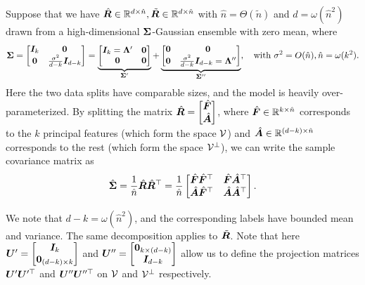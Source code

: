 Suppose that we have $\hat{{\bm{R}}} \in \mathbb{R}^{d\times \hat{n}}, \tilde{{\bm{R}}} \in \mathbb{R}^{d\times \tilde{n}}$ with $\hat{n} = \Theta(\tilde{n})$ and $d = \omega(\hat{n}^2)$ drawn from a high-dimensional ${\bm{\Sigma}}$-Gaussian ensemble with zero mean, where 
\begin{align}
    {\bm{\Sigma}}  = \begin{bmatrix}
        {\bm{I}}_k  & \mathbf{0} \\
        \mathbf{0} & \frac{\sigma^2}{d-k}{\bm{I}}_{d-k}
    \end{bmatrix} = 
    \underbrace{\begin{bmatrix}
        {\bm{I}}_k={\bm{\Lambda}}'  & \mathbf{0} \\
        \mathbf{0} & \mathbf{0}
    \end{bmatrix}}_{{\bm{\Sigma}}'} + 
    \underbrace{\begin{bmatrix}
        \mathbf{0}  & \mathbf{0} \\
        \mathbf{0} & \frac{\sigma^2}{d-k}{\bm{I}}_{d-k}={\bm{\Lambda}}''
    \end{bmatrix} }_{{\bm{\Sigma}}''}, \quad \text{with }\sigma^2 = O(\hat{n}), \hat{n} = \omega(k^2).  
\end{align}
Here the two data splits have comparable sizes, and the model is heavily over-parameterized. 
By splitting the matrix $\hat{{\bm{R}}} = \begin{bmatrix}
    \hat{{\bm{F}}} \\ \hat{{\bm{A}}}
\end{bmatrix}$, where $\hat{{\bm{F}}} \in \mathbb{R}^{k \times \hat{n}}$ corresponds to the $k$ principal features (which form the space ${\mathcal{V}}$) and $\hat{{\bm{A}}} \in \mathbb{R}^{(d-k) \times \hat{n}}$ corresponds to the rest (which form the space ${\mathcal{V}}^\perp$), we can write the sample covariance matrix as
\[
    \hat{{\bm{\Sigma}}} = \frac{1}{\hat{n}}\hat{{\bm{R}}}\hat{{\bm{R}}}^\top = \frac{1}{\hat{n}}
    \begin{bmatrix}
        \hat{{\bm{F}}}\hat{{\bm{F}}}^\top & \hat{{\bm{F}}}\hat{{\bm{A}}}^\top \\
        \hat{{\bm{A}}}\hat{{\bm{F}}}^\top & \hat{{\bm{A}}}\hat{{\bm{A}}}^\top
    \end{bmatrix}. 
\]

We note that $d - k = \omega(\hat{n}^2)$, and the corresponding labels have bounded mean and variance. The same decomposition applies to $\tilde{{\bm{R}}}$. Note that here ${\bm{U}}' = \begin{bmatrix}
    {\bm{I}}_k \\ \mathbf{0}_{(d-k) \times k}
\end{bmatrix}$ and ${\bm{U}}'' =  \begin{bmatrix}
    \mathbf{0}_{k \times (d-k)} \\ {\bm{I}}_{d-k}
\end{bmatrix}$ allow us to define the projection matrices ${\bm{U}}'{\bm{U}}'^\top$ and ${\bm{U}}''{\bm{U}}''^\top$ on ${\mathcal{V}}$ and ${\mathcal{V}}^\perp$ respectively. 

